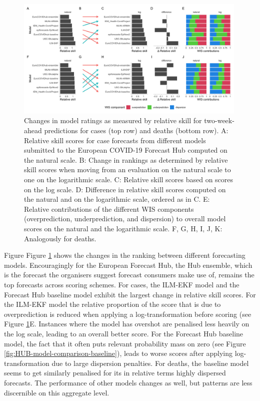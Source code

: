 \documentclass{article}
\begin{document}
\begin{figure}[h!]
    \centering
    \includegraphics[width=0.99\textwidth]{output/figures/HUB-pairwise-comparisons.png}
    \caption{Changes in model ratings as measured by relative skill for two-week-ahead predictions for cases (top row) and deaths (bottom row). A: Relative skill scores for case forecasts from different models submitted to the European COVID-19 Forecast Hub computed on the natural scale. B: Change in rankings as determined by relative skill scores when moving from an evaluation on the natural scale to one on the logarithmic scale. C: Relative skill scores based on scores on the log scale. D: Difference in relative skill scores computed on the natural and on the logarithmic scale, ordered as in C. E: Relative contributions of the different WIS components (overprediction, underprediction, and dispersion) to overall model scores on the natural and the logarithmic scale. F, G, H, I, J, K: Analogously for deaths.}
    \label{fig:HUB-rank-order}
\end{figure}

Figure Figure \ref{fig:HUB-rank-order} shows the changes in the ranking between different forecasting models. Encouragingly for the European Forecast Hub, the Hub ensemble, which is the forecast the organisers suggest forecast consumers make use of, remains the top forecasts across scoring schemes. For cases, the ILM-EKF model and the Forecast Hub baseline model exhibit the largest change in relative skill scores. For the ILM-EKF model the relative proportion of the score that is due to overprediction is reduced when applying a log-transformation before scoring (see Figure \ref{fig:HUB-rank-order}E. Instances where the model has overshot are penalised less heavily on the log scale, leading to an overall better score. For the Forecast Hub baseline model, the fact that it often puts relevant probability mass on zero (see Figure \ref{fig:HUB-model-comparison-baseline}), leads to worse scores after applying log-transformation due to large dispersion penalties. For deaths, the baseline model seems to get similarly penalised for its in relative terms highly dispersed forecasts. The performance of other models changes as well, but patterns are less discernible on this aggregate level. 
\end{document}
